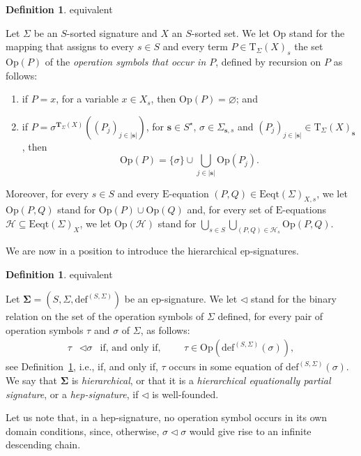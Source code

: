 \documentclass[a4paper, reqno]{amsbook}
\makeatletter
\newcommand{\bb}[1]{\ensuremath{\lvert #1 \rvert}}
\newcommand{\sig}[1]{\mathbf{#1}}             %
\theoremstyle{plain}
\theoremstyle{definition}
\newtheorem{definition}[theorem]{Definition}
\newcommand*{\CA@leanpending}{}
\newcommand*{\CA@leanrelation}{}
\newcommand*{\lean}[2]{%
  \ifcsname\string\color@lean@#1\endcsname\else
    \PackageError{main}{Unknown relation `#1' in \string\lean}{Use equivalent, weaker or stronger.}%
  \fi
  \gdef\CA@leanrelation{#1}%
  \gdef\CA@leanpending{#2}}
\makeatother
\begin{document}
\begin{definition}\label{DOpSymbols}\lean{equivalent}{Term.symbols}
Let $\Sigma$ be an $S$-sorted signature and $X$ an $S$-sorted set.
We let $\mathrm{Op}$ stand for the mapping that assigns to every $s\in S$ and every term $P\in\mathrm{T}_{\Sigma}(X)_{s}$ the set $\mathrm{Op}(P)$ of the \emph{operation symbols that occur in $P$}, defined by recursion on $P$ as follows:
\begin{enumerate}
\item if $P=x$, for a variable $x\in X_{s}$, then $\mathrm{Op}(P)=\varnothing$; and
\item if $P=\sigma^{\mathbf{T}_{\Sigma}(X)}((P_{j})_{j\in\bb{\mathbf{s}}})$, for $\mathbf{s}\in S^{\star}$, $\sigma\in\Sigma_{\mathbf{s},s}$ and $(P_{j})_{j\in\bb{\mathbf{s}}}\in\mathrm{T}_{\Sigma}(X)_{\mathbf{s}}$, then
$$
\mathrm{Op}(P)=\{\sigma\}\cup\textstyle\bigcup_{j\in\bb{\mathbf{s}}}\mathrm{Op}(P_{j}).
$$
\end{enumerate}
Moreover, for every $s\in S$ and every $\mathrm{E}$-equation $(P,Q)\in\mathrm{Eeqt}(\Sigma)_{X,s}$, we let $\mathrm{Op}(P,Q)$ stand for $\mathrm{Op}(P)\cup\mathrm{Op}(Q)$ and, for every set of $\mathrm{E}$-equations $\mathcal{H}\subseteq\mathrm{Eeqt}(\Sigma)_{X}$, we let $\mathrm{Op}(\mathcal{H})$ stand for $\bigcup_{s\in S}\bigcup_{(P,Q)\in\mathcal{H}_{s}}\mathrm{Op}(P,Q)$.
\end{definition}

We are now in a position to introduce the hierarchical ep-signatures.

\begin{definition}\label{DHepSig}\lean{equivalent}{HepSignature}
Let $\sig{\Sigma}=(S,\Sigma,\mathrm{def}^{(S,\Sigma)})$ be an ep-signature.
We let $\lhd$ stand for the binary relation on the set of the operation symbols of $\Sigma$ defined, for every pair of operation symbols $\tau$ and $\sigma$ of $\Sigma$, as follows:
\begin{align*}
\tau&\lhd\sigma
&\mbox{if, and only if,}&&
&\tau\in\mathrm{Op}\left(\mathrm{def}^{(S,\Sigma)}(\sigma)\right),
\end{align*}
see Definition~\ref{DOpSymbols}, i.e., if, and only if, $\tau$ occurs in some equation of $\mathrm{def}^{(S,\Sigma)}(\sigma)$.
We say that $\sig{\Sigma}$ is \emph{hierarchical}, or that it is a \emph{hierarchical equationally partial signature}, or a \emph{hep-signature}, if $\lhd$ is well-founded.
\end{definition}

Let us note that, in a hep-signature, no operation symbol occurs in its own domain conditions, since, otherwise, $\sigma\lhd\sigma$ would give rise to an infinite descending chain.
\end{document}
